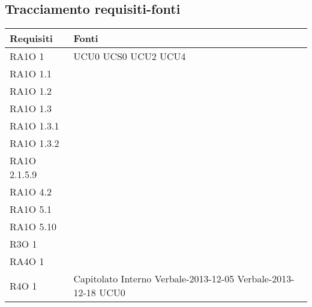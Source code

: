 \subsection{Tracciamento requisiti-fonti}
      \begin{center}
      \bgroup
      \def\arraystretch{1.8}
      \begin{longtable}{ | p{5cm} | p{5cm} |}
    
      \cellcolor[gray]{0.9} \textbf{Requisiti} & \cellcolor[gray]{0.9} \textbf{Fonti} \\ \hline       
        RA1O 1 &  UCU0 \newline  UCS0 \newline  UCU2 \newline  UCU4 \newline  \\ \hline      
        RA1O 1.1 &  \\ \hline      
        RA1O 1.2 &  \\ \hline      
        RA1O 1.3 &  \\ \hline      
        RA1O 1.3.1 &  \\ \hline      
        RA1O 1.3.2 &  \\ \hline      
        RA1O 2.1.5.9 &  \\ \hline      
        RA1O 4.2 &  \\ \hline      
        RA1O 5.1 &  \\ \hline      
        RA1O 5.10 &  \\ \hline      
        R3O 1 &  \\ \hline      
        RA4O 1 &  \\ \hline      
        R4O 1 &  Capitolato \newline  Interno \newline  Verbale-2013-12-05 \newline  Verbale-2013-12-18 \newline  UCU0 \newline  \\ \hline     
      \end{longtable}
      \egroup
      \end{center}  
\clearpage

